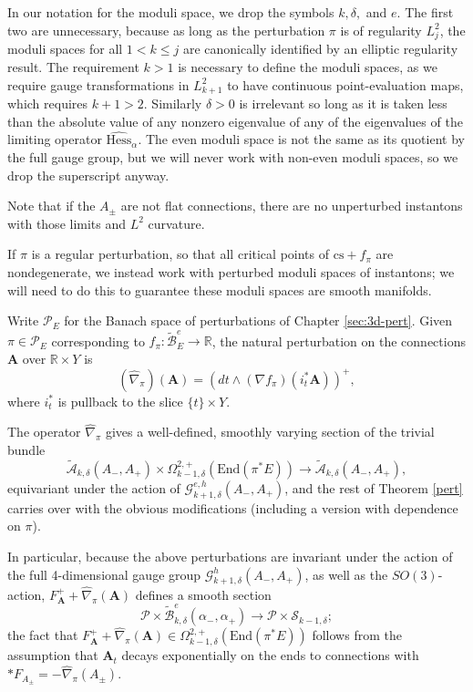 \documentclass[10pt,a4paper]{amsart}
\newcommand{\pE}{\pi^* \! E}
\theoremstyle{definition}
\theoremstyle{remark}
\numberwithin{figure}{qchap}
\begin{document}
In our notation for the moduli space, we drop the symbols $k,\delta,$ and $e$. The first two are unnecessary, because as long as the perturbation $\pi$ is of regularity $L^2_j$, the moduli spaces for all $1 < k \leq j$ are canonically identified by an elliptic regularity result. The requirement $k > 1$ is necessary to define the moduli spaces, as we require gauge transformations in $L^2_{k+1}$ to have continuous point-evaluation maps, which requires $k+1 > 2$. Similarly $\delta > 0$ is irrelevant so long as it is taken less than the absolute value of any nonzero eigenvalue of any of the eigenvalues of the limiting operator $\widehat{\text{Hess}}_{\alpha}$. The even moduli space is not the same as its quotient by the full gauge group, but we will never work with non-even moduli spaces, so we drop the superscript anyway.

Note that if the $A_\pm$ are not flat connections, there are no unperturbed instantons with those limits and $L^2$ curvature. 

If $\pi$ is a regular perturbation, so that all critical points of $\text{cs}+f_\pi$ are nondegenerate, we instead work with perturbed moduli spaces of instantons; we will need to do this to guarantee these moduli spaces are smooth manifolds.

Write $\mathcal P_E$ for the Banach space of perturbations of Chapter \ref{sec:3d-pert}. Given $\pi \in \mathcal P_E$ corresponding to $f_\pi: \widetilde{\mathcal B}^e_E \to \mathbb R$, the natural perturbation on the connections $\mathbf{A}$ over $\mathbb R \times Y$ is $$(\widehat \nabla_\pi)(\mathbf{A}) = \left(dt \wedge (\nabla f_\pi)(i_t^*\mathbf{A})\right)^+,$$ where $i_t^*$ is pullback to the slice $\{t\} \times Y$.

The operator $\widehat \nabla_\pi$ gives a well-defined, smoothly varying section of the trivial bundle $$\widetilde{\mathcal A}_{k,\delta}(A_-, A_+) \times \Omega^{2,+}_{k-1,\delta}(\text{End}(\pE)) \to \widetilde{\mathcal A}_{k,\delta}(A_-, A_+),$$ 
equivariant under the action of $\mathcal G^{e,h}_{k+1,\delta}(A_-, A_+)$, and the rest of Theorem \ref{pert} carries over with the obvious modifications (including a version with dependence on $\pi$). 

In particular, because the above perturbations are invariant under the action of the full 4-dimensional gauge group $\mathcal G^h_{k+1,\delta}(A_-, A_+)$, as well as the $SO(3)$-action, $F_{\mathbf{A}}^+ + \widehat\nabla_\pi(\mathbf{A})$ defines a smooth section 
\begin{equation}\label{ASDsec}\mathcal P \times \widetilde{\mathcal B}^e_{k,\delta}(\alpha_-, \alpha_+) \to \mathcal P \times \mathcal S_{k-1,\delta};\end{equation}
the fact that $F_{\mathbf{A}}^+ + \widehat \nabla_\pi(\mathbf{A}) \in \Omega^{2,+}_{k-1,\delta}\left(\text{End}(\pE)\right)$ follows from the assumption that $\mathbf{A}_t$ decays exponentially on the ends to connections with $*F_{A_\pm} = - \widehat \nabla_\pi(A_\pm)$. 
\end{document}
